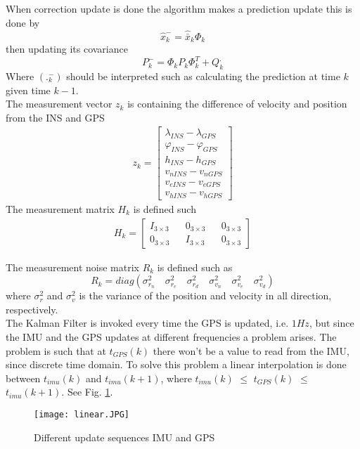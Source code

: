 When correction update is done the algorithm makes a prediction update this is done by 
\begin{equation}
\hat{x}_k^- = \hat{\bar{x}}_k\Phi_k
\end{equation}
then updating its covariance
\begin{equation}
P_k^- = \Phi_k P_k \Phi_k^T + Q_k^.
\end{equation}
Where $(._k^-)$ should be interpreted such as calculating the prediction at time $k$ given time $k-1$.\\

The measurement vector $z_k$ is containing the difference of velocity and position from the INS and GPS
\begin{align}
z_k =
\begin{bmatrix}
\lambda_{INS} - \lambda_{GPS} \\
\varphi_{INS} - \varphi_{GPS} \\
h_{INS} - h_{GPS} \\
v_{nINS} - v_{nGPS} \\
v_{eINS} - v_{eGPS} \\
v_{hINS} - v_{hGPS}
\end{bmatrix}
\end{align}
The measurement matrix $H_k$ is defined such
\begin{align}
H_k = 
\begin{bmatrix}
I_{3\times 3} && 0_{3 \times 3} && 0_{3 \times 3} \\
0_{3 \times 3} && I_{3\times 3} && 0_{3 \times 3}
\end{bmatrix}
\end{align}

The measurement noise matrix $R_k$ is defined such as 
\begin{equation}
R_k = diag(\sigma_{r_n}^2 \quad \sigma_{r_e}^2 \quad \sigma_{r_d}^2 \quad \sigma_{v_n}^2 \quad \sigma_{v_e}^2 \quad \sigma_{v_d}^2)
\end{equation}
where $\sigma_{r}^2$ and $\sigma_{v}^2$ is the variance of the position and velocity in all direction, respectively.\\

The Kalman Filter is invoked every time the GPS is updated, i.e. $1Hz$, but since the IMU and the GPS updates at different frequencies a problem arises. The problem is such that at $t_{GPS}(k)$ there won't be a value to read from the IMU, since discrete time domain. To solve this problem a linear interpolation is done between $t_{imu}(k)$ and $t_{imu}(k+1)$, where $t_{imu}(k)$ $\leq$ $t_{GPS}(k)$ $\leq$  $t_{imu}(k+1)$. See Fig. \ref{Fig.different_update}.
\begin{figure}[H]
\centering
\texttt{[image: linear.JPG]}
\caption{Different update sequences IMU and GPS}
\label{Fig.different_update}
\end{figure}

